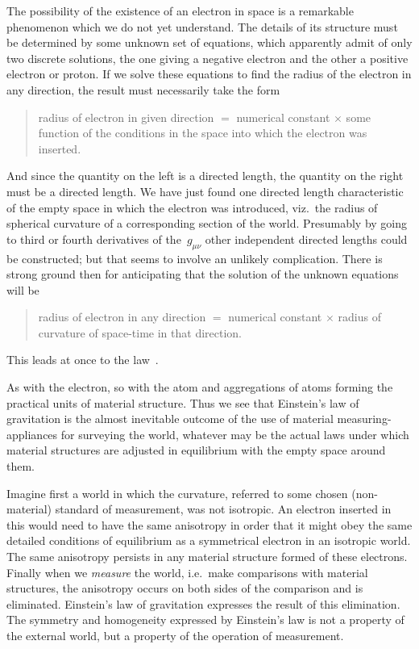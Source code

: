 \documentclass[12pt]{book}
\begin{document}
The possibility of the existence of an electron in space is a remarkable
phenomenon which we do not yet understand. The details of its structure
must be determined by some unknown set of equations, which apparently
admit of only two discrete solutions, the one giving a negative electron and
the other a positive electron or proton. If we solve these equations to find
the radius of the electron in any direction, the result must necessarily take
the form
\begin{quote}
  radius of electron in given direction $=$ numerical constant $\times$ some
  function of the conditions in the space into which the electron
  was inserted.
\end{quote}
And since the quantity on the left is a directed length, the quantity on the
right must be a directed length. We have just found one directed length
characteristic of the empty space in which the electron was introduced, viz.\
the radius of spherical curvature of a corresponding section of the world.
Presumably by going to third or fourth derivatives of the~$g_{\mu\nu}$ other independent
directed lengths could be constructed; but that seems to involve an unlikely
complication. There is strong ground then for anticipating that the solution
of the unknown equations will be
\begin{quote}
radius of electron in any direction $=$ numerical constant $\times$ radius of
curvature of space-time in that direction.
\end{quote}
This leads at once to the law~.

As with the electron, so with the atom and aggregations of atoms forming
the practical units of material structure. Thus we see that Einstein's law of
gravitation is the almost inevitable outcome of the use of material measuring\hyp{}appliances
for surveying the world, whatever may be the actual laws under
which material structures are adjusted in equilibrium with the empty space
around them.

Imagine first a world in which the curvature, referred to some chosen
(non\hyp{}material) standard of measurement, was not isotropic. An electron inserted
in this would need to have the same anisotropy in order that it might
obey the same detailed conditions of equilibrium as a symmetrical electron in
an isotropic world. The same anisotropy persists in any material structure
formed of these electrons. Finally when we \emph{measure} the world, i.e.\ make comparisons
with material structures, the anisotropy occurs on both sides of the
comparison and is eliminated. Einstein's law of gravitation expresses the
\index{Einstein's law of gravitation!interpretation of}%
result of this elimination. The symmetry and homogeneity expressed by
Einstein's law is not a property of the external world, but a property of the
operation of measurement.
\end{document}
